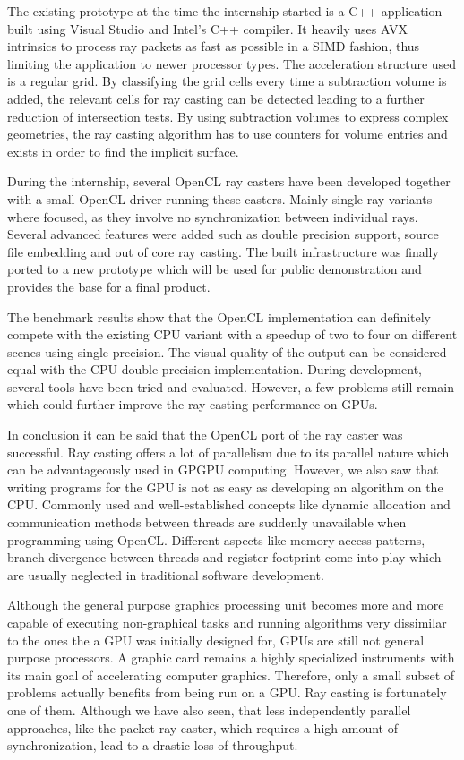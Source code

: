 The existing prototype at the time the internship started is a C++ application built using Visual Studio and Intel's C++ compiler. It heavily uses AVX intrinsics to process ray packets as fast as possible in a SIMD fashion, thus limiting the application to newer processor types. The acceleration structure used is a regular grid. By classifying the grid cells every time a subtraction volume is added, the relevant cells for ray casting can be detected leading to a further reduction of intersection tests. By using subtraction volumes to express complex geometries, the ray casting algorithm has to use counters for volume entries and exists in order to find the implicit surface.

During the internship, several OpenCL ray casters have been developed together with a small OpenCL driver running these casters. Mainly single ray variants where focused, as they involve no synchronization between individual rays. Several advanced features were added such as double precision support, source file embedding and out of core ray casting. The built infrastructure was finally ported to a new prototype which will be used for public demonstration and provides the base for a final product.

The benchmark results show that the OpenCL implementation can definitely compete with the existing CPU variant with a speedup of two to four on different scenes using single precision. The visual quality of the output can be considered equal with the CPU double precision implementation. During development, several tools have been tried and evaluated. However, a few problems still remain which could further improve the ray casting performance on GPUs.

In conclusion it can be said that the OpenCL port of the ray caster was successful. Ray casting offers a lot of parallelism due to its parallel nature which can be advantageously used in GPGPU computing. However, we also saw that writing programs for the GPU is not as easy as developing an algorithm on the CPU. Commonly used and well-established concepts like dynamic allocation and communication methods between threads are suddenly unavailable when programming using OpenCL. Different aspects like memory access patterns, branch divergence between threads and register footprint come into play which are usually neglected in traditional software development.

Although the general purpose graphics processing unit becomes more and more capable of executing non-graphical tasks and running algorithms very dissimilar to the ones the a GPU was initially designed for, GPUs are still not general purpose processors. A graphic card remains a highly specialized instruments with its main goal of accelerating computer graphics. Therefore, only a small subset of problems actually benefits from being run on a GPU. Ray casting is fortunately one of them. Although we have also seen, that less independently parallel approaches, like the packet ray caster, which requires a high amount of synchronization, lead to a drastic loss of throughput.

